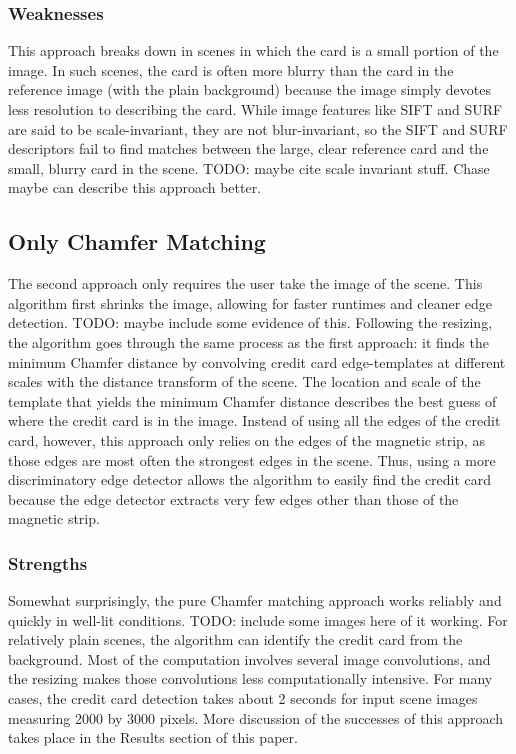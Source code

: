 \documentclass[10pt,twocolumn,letterpaper]{article}
\begin{document}
\subsubsection{Weaknesses}
	This approach breaks down in scenes in which the card is a small portion of the image. In such scenes, the card is often more blurry than the card in the reference image (with the plain background) because the image simply devotes less resolution to describing the card. While image features like SIFT and SURF are said to be scale-invariant, they are not blur-invariant, so the SIFT and SURF descriptors fail to find matches between the large, clear reference card and the small, blurry card in the scene. TODO: maybe cite scale invariant stuff. Chase maybe can describe this approach better. 
	
\subsection{Only Chamfer Matching}
The second approach only requires the user take the image of the scene. This algorithm first shrinks the image, allowing for faster runtimes and cleaner edge detection. TODO: maybe include some evidence of this. Following the resizing, the algorithm goes through the same process as the first approach: it finds the minimum Chamfer distance by convolving credit card edge-templates at different scales with the distance transform of the scene. The location and scale of the template that yields the minimum Chamfer distance describes the best guess of where the credit card is in the image. 
	Instead of using all the edges of the credit card, however, this approach only relies on the edges of the magnetic strip, as those edges are most often the strongest edges in the scene. Thus, using a more discriminatory edge detector allows the algorithm to easily find the credit card because the edge detector extracts very few edges other than those of the magnetic strip.

\subsubsection{Strengths}
	Somewhat surprisingly, the pure Chamfer matching approach works reliably and quickly in well-lit conditions. TODO: include some images here of it working. For relatively plain scenes, the algorithm can identify the credit card from the background. Most of the computation involves several image convolutions, and the resizing makes those convolutions less computationally intensive. For many cases, the credit card detection takes about 2 seconds for input scene images measuring 2000 by 3000 pixels. More discussion of the successes of this approach takes place in the Results section of this paper.
\end{document}
